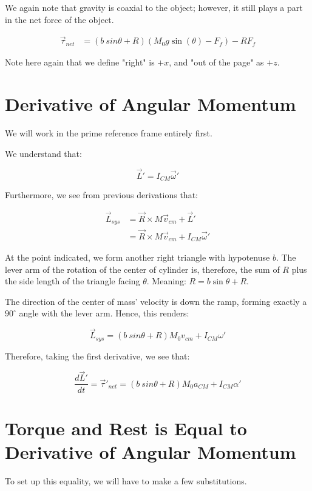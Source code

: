 \documentclass[letterpaper]{article}
\begin{document}
We again note that gravity is coaxial to the object; however, it still plays a part in the net force of the object.

\begin{align}
   \vec{\tau}_{net} &= (b\ sin\theta+R)(M_0g\sin(\theta) - F_f)-RF_f 
\end{align}

Note here again that we define "right" is \(+x\), and "out of the page" as \(+z\).

\section{Derivative of Angular Momentum}
\label{sec:org6b487cc}
We will work in the prime reference frame entirely first.

We understand that:

\begin{equation}
   \vec{L}' = I_{CM}\vec{\omega}'
\end{equation}

Furthermore, we see from previous derivations that:

\begin{align}
   \vec{L}_{sys} &= \vec{R} \times M \vec{v}_{cm} + \vec{L}'\\
&= \vec{R} \times M \vec{v}_{cm} + I_{CM}\vec{\omega}'
\end{align}

At the point indicated, we form another right triangle with hypotenuse \(b\). The lever arm of the rotation of the center of cylinder is, therefore, the sum of \(R\) plus the side length of the triangle facing \(\theta\). Meaning: \(R = b\sin\theta + R\).

The direction of the center of mass' velocity is down the ramp, forming exactly a \(90^\circ\) angle with the lever arm. Hence, this renders:

\begin{equation}
   \vec{L}_{sys} = (b\ sin\theta +R) M_0v_{cm} + I_{CM} \omega'
\end{equation}

Therefore, taking the first derivative, we see that:

\begin{equation}
   \frac{d\vec{L}'}{dt} = \vec{\tau}'_{net} = (b\ sin\theta +R)M_0 a_{CM} + I_{CM}\alpha' 
\end{equation}

\section{Torque and Rest is Equal to Derivative of Angular Momentum}
\label{sec:orgaaeefea}
To set up this equality, we will have to make a few substitutions.
\end{document}

